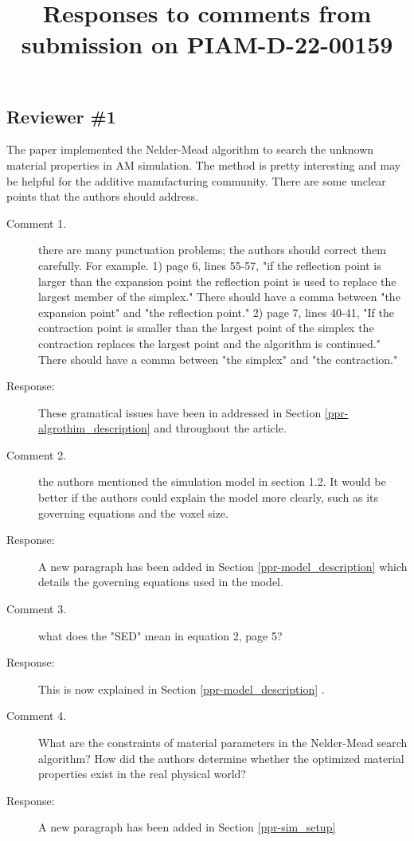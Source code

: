 \documentclass{article}
\begin{document}
\title{Responses to comments from submission on PIAM-D-22-00159}
\date{}

\maketitle

\subsection*{Reviewer \#1} The paper implemented the Nelder-Mead algorithm to search the unknown material properties in AM simulation. The method is pretty interesting and may be helpful for the additive manufacturing community. There are some unclear points that the authors should address.
\begin{description}
	\item[Comment 1.] there are many punctuation problems; the authors should correct them carefully. For example. 1) page 6, lines 55-57, "if the reflection point is larger than the expansion point the reflection point is used to replace the largest member of the simplex." There should have a comma between "the expansion point" and "the reflection point." 2) page 7, lines 40-41, "If the contraction point is smaller than the largest point of the simplex the contraction replaces the largest point and the algorithm is continued." There should have a comma between "the simplex" and "the contraction."
 	\item[Response:] These gramatical issues have been in addressed in Section \ref{ppr-algrothim_description} and throughout the article.
 	\item[Comment 2.] the authors mentioned the simulation model in section 1.2. It would be better if the authors could explain the model more clearly, such as its governing equations and the voxel size.
 	\item[Response:] A new paragraph has been added in Section \ref{ppr-model_description} which details the governing equations used in the model.
 	\item[Comment 3.] what does the "SED" mean in equation 2, page 5?
 	\item[Response:] This is now explained in Section \ref{ppr-model_description}
	.
 	\item[Comment 4.] What are the constraints of material parameters in the Nelder-Mead search algorithm? How did the authors determine whether the optimized material properties exist in the real physical world?
 	\item[Response:] A new paragraph has been added in Section \ref{ppr-sim_setup}

\end{description}
\end{document}
